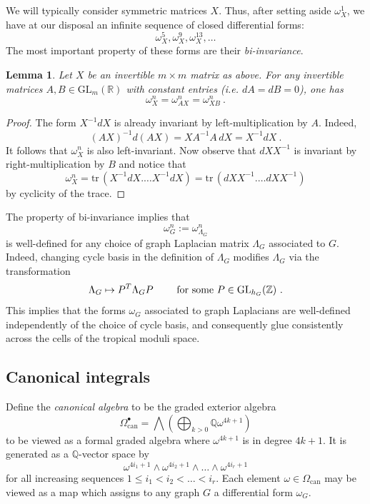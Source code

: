 \documentclass[12pt]{amsart}
\newcommand{\QQ}{{\mathbb Q}}
\newcommand{\RR}{{\mathbb R}}
\newcommand{\ZZ}{{\mathbb Z}}
\newcommand{\tr}{\mathrm{tr}\,}
\theoremstyle{plain}
\newtheorem{lem}[thm]{Lemma}
\newcommand{\GL}{\mathrm{GL}}
\newcommand{\0}{\color{blue}{\mathsf{0}}}
\begin{document}
We will typically consider symmetric matrices $X$. Thus, after setting aside $\omega^1_X$,  we have at our disposal an infinite sequence of closed differential forms:
\[ \omega^5_X , \omega^9_X, \omega^{13}_X, \ldots \]
The most important property of these forms are their  \emph{bi-invariance}.

\begin{lem} Let $X$ be an invertible  $m\times m$ matrix as above.  For any invertible matrices $A, B \in \GL_m(\RR)$ with constant entries (i.e. $dA= dB=0$), one has
\[ \omega^n_{X}= \omega^n_{AX} = \omega^n_{XB}\ .\] 
\end{lem} 
\begin{proof} The form $X^{-1} dX$ is already invariant by left-multiplication by $A$. Indeed, 
\[  (AX)^{-1} d(AX) =  X A^{-1} A \, dX = X^{-1} dX\ .\]
It follows that $\omega^n_X$ is also left-invariant. Now observe that  $dX X^{-1}$ is invariant by right-multiplication by $B$ and notice that
\[  \omega^n_X = \tr (X^{-1} dX. \ldots X^{-1} dX) = \tr (  dX X^{-1}. \ldots dX X^{-1})\]
by cyclicity of the trace.  
\end{proof} 
The property of bi-invariance implies that 
\[ \omega^n_G := \omega^n_{\Lambda_G}\]
is well-defined for any choice of graph Laplacian matrix $\Lambda_G$ associated to $G$. Indeed, changing cycle basis in the definition of $\Lambda_G$ modifies $\Lambda_G$ via the transformation 
\[ \Lambda_G \mapsto P^T \Lambda_G P \qquad \hbox{ for some } P \in \GL_{h_G}(\ZZ) \ . \] 
This implies that the forms $\omega_G$
 associated to graph Laplacians are well-defined independently of the choice of cycle basis, and consequently glue consistently across the cells of the tropical moduli space.
 
\subsection{Canonical integrals}
Define the \emph{canonical algebra} to be the  graded exterior algebra 
\[ \Omega^{\bullet}_{\mathrm{can}} = \bigwedge \left( \bigoplus_{k>0} \QQ \omega^{4k+1}\right) \]
to be viewed as a formal graded algebra where $\omega^{4k+1}$ is in degree $4k+1$. 
 It is generated as a $\QQ$-vector space by 
\[  \omega^{4i_1+1} \wedge \omega^{4i_2+1} \wedge \ldots \wedge \omega^{4i_r+1}\]
for all increasing sequences $1\leq i_1< i_2< \ldots< i_r$.  Each element $\omega \in \Omega_{\mathrm{can}}$ may  be viewed as a map which assigns to any graph  $G$ a differential form $\omega_G$. 
\end{document}
